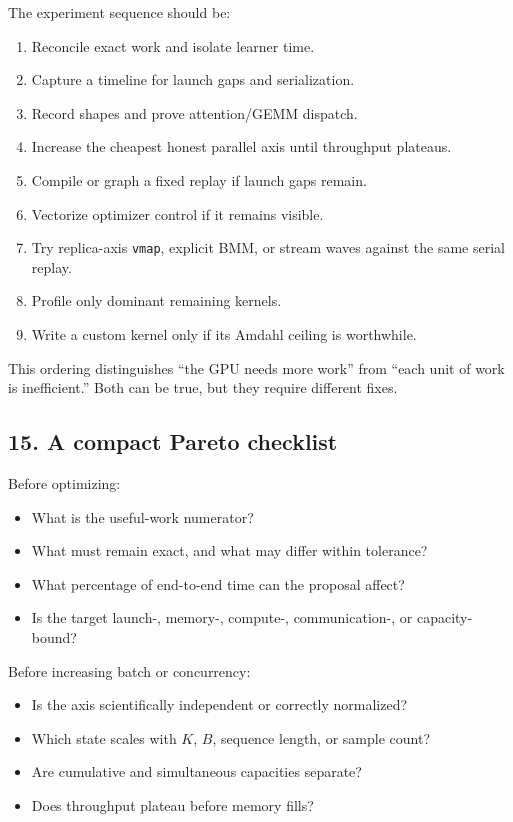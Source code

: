 \documentclass[
  10pt,
  letterpaper,
]{article}
\providecommand{\tightlist}{%
  \setlength{\itemsep}{0pt}\setlength{\parskip}{0pt}}
\begin{document}
The experiment sequence should be:

\begin{enumerate}
\def\labelenumi{\arabic{enumi}.}
\tightlist
\item
  Reconcile exact work and isolate learner time.
\item
  Capture a timeline for launch gaps and serialization.
\item
  Record shapes and prove attention/GEMM dispatch.
\item
  Increase the cheapest honest parallel axis until throughput plateaus.
\item
  Compile or graph a fixed replay if launch gaps remain.
\item
  Vectorize optimizer control if it remains visible.
\item
  Try replica-axis \texttt{vmap}, explicit BMM, or stream waves against
  the same serial replay.
\item
  Profile only dominant remaining kernels.
\item
  Write a custom kernel only if its Amdahl ceiling is worthwhile.
\end{enumerate}

This ordering distinguishes ``the GPU needs more work'' from ``each unit
of work is inefficient.'' Both can be true, but they require different
fixes.

\subsection{15. A compact Pareto
checklist}\label{15-a-compact-pareto-checklist}

Before optimizing:

\begin{itemize}
\tightlist
\item
  What is the useful-work numerator?
\item
  What must remain exact, and what may differ within tolerance?
\item
  What percentage of end-to-end time can the proposal affect?
\item
  Is the target launch-, memory-, compute-, communication-, or
  capacity-bound?
\end{itemize}

Before increasing batch or concurrency:

\begin{itemize}
\tightlist
\item
  Is the axis scientifically independent or correctly normalized?
\item
  Which state scales with \(K\), \(B\), sequence length, or sample
  count?
\item
  Are cumulative and simultaneous capacities separate?
\item
  Does throughput plateau before memory fills?
\end{itemize}
\end{document}
